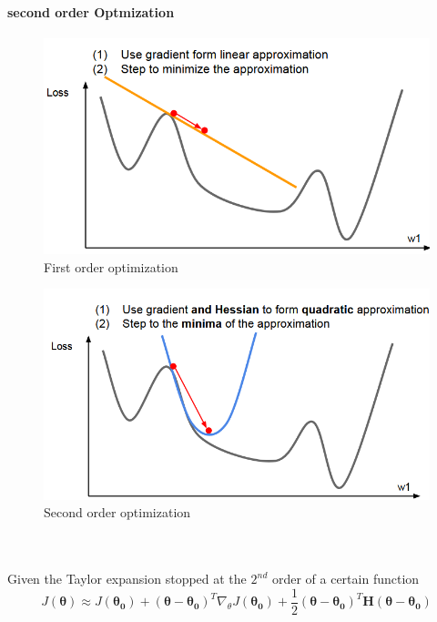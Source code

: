 \documentclass[11pt]{article}
\begin{document}
\paragraph{second order Optmization}
\begin{minipage}{0.5\textwidth}
\begin{figure} [H]
\centering 
\includegraphics[scale=0.54]{L618.pdf}
\caption{ First order optimization}
\label{fig:L618}
\end{figure}
\end{minipage}
\begin{minipage}{0.5\textwidth}
\begin{figure} [H]
\centering 
\includegraphics[scale=0.54]{L619.pdf}
\caption{ Second order optimization}
\label{fig:L619}
\end{figure}
\end{minipage}\\\\
Given the Taylor expansion stopped at the $2^{nd}$ order of a certain function
\begin{equation}
    J(\boldsymbol{\theta}) \approx     J(\boldsymbol{\theta_0}) +(\boldsymbol{\theta}-\boldsymbol{\theta_0})^T\nabla_{\theta} J(\boldsymbol{\theta_0})+\frac{1}{2}(\boldsymbol{\theta}-\boldsymbol{\theta_0})^T\mathbf{H}(\boldsymbol{\theta}-\boldsymbol{\theta_0})
\end{equation}{}
\end{document}
